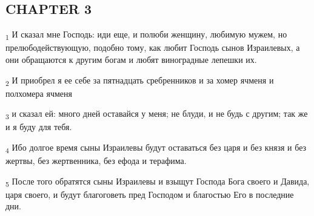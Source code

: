 \subsection{CHAPTER 3}
\begin{tcolorbox}
\textsubscript{1} И сказал мне Господь: иди еще, и полюби женщину, любимую мужем, но прелюбодействующую, подобно тому, как любит Господь сынов Израилевых, а они обращаются к другим богам и любят виноградные лепешки их.
\end{tcolorbox}
\begin{tcolorbox}
\textsubscript{2} И приобрел я ее себе за пятнадцать сребренников и за хомер ячменя и полхомера ячменя
\end{tcolorbox}
\begin{tcolorbox}
\textsubscript{3} и сказал ей: много дней оставайся у меня; не блуди, и не будь с другим; так же и я буду для тебя.
\end{tcolorbox}
\begin{tcolorbox}
\textsubscript{4} Ибо долгое время сыны Израилевы будут оставаться без царя и без князя и без жертвы, без жертвенника, без ефода и терафима.
\end{tcolorbox}
\begin{tcolorbox}
\textsubscript{5} После того обратятся сыны Израилевы и взыщут Господа Бога своего и Давида, царя своего, и будут благоговеть пред Господом и благостью Его в последние дни.
\end{tcolorbox}
